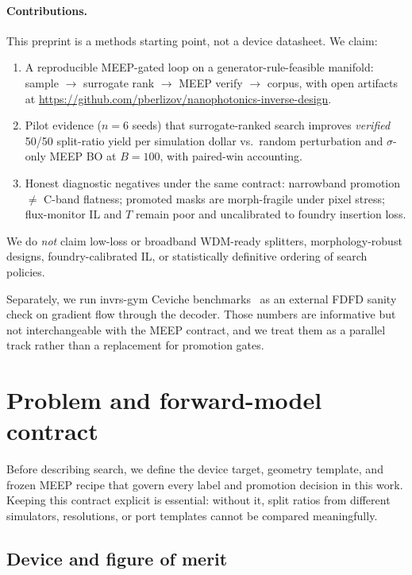 \documentclass[11pt,a4paper]{article}
\begin{document}
\paragraph{Contributions.}
This preprint is a methods starting point, not a device datasheet.
We claim:
\begin{enumerate}
  \item A reproducible MEEP-gated loop on a generator-rule-feasible manifold: sample $\to$ surrogate rank $\to$ MEEP verify $\to$ corpus, with open artifacts at \url{https://github.com/pberlizov/nanophotonics-inverse-design}.
  \item Pilot evidence ($n{=}6$ seeds) that surrogate-ranked search improves \emph{verified} 50/50 split-ratio yield per simulation dollar vs.\ random perturbation and $\sigma$-only MEEP BO at $B{=}100$, with paired-win accounting.
  \item Honest diagnostic negatives under the same contract: narrowband promotion $\neq$ C-band flatness; promoted masks are morph-fragile under pixel stress; flux-monitor IL and $T$ remain poor and uncalibrated to foundry insertion loss.
\end{enumerate}
We do \emph{not} claim low-loss or broadband WDM-ready splitters, morphology-robust designs, foundry-calibrated IL, or statistically definitive ordering of search policies.

Separately, we run invrs-gym Ceviche benchmarks~\cite{Christiansen2024InvrsGym,Fan2019Ceviche,Schubert2022CevicheChallenges} as an external FDFD sanity check on gradient flow through the decoder.
Those numbers are informative but not interchangeable with the MEEP contract, and we treat them as a parallel track rather than a replacement for promotion gates.

\section{Problem and forward-model contract}
\label{sec:problem}

Before describing search, we define the device target, geometry template, and frozen MEEP recipe that govern every label and promotion decision in this work.
Keeping this contract explicit is essential: without it, split ratios from different simulators, resolutions, or port templates cannot be compared meaningfully.

\subsection{Device and figure of merit}
\end{document}

